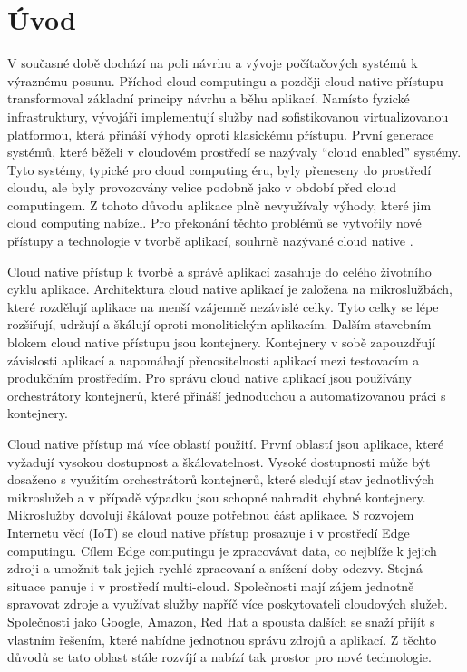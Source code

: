 \chapter{Úvod}
\setcounter{page}{1}
V současné době dochází na poli návrhu a vývoje počítačových systémů k výraznému posunu. Příchod cloud computingu a později cloud native přístupu transformoval \linebreak základní principy návrhu a běhu aplikací. Namísto fyzické infrastruktury, vývojáři \linebreak implementují služby nad sofistikovanou virtualizovanou platformou, která přináší \linebreak výhody oproti klasickému přístupu. První generace systémů, které běželi v cloudovém \linebreak prostředí se nazývaly “cloud enabled” systémy. Tyto systémy, typické pro cloud computing éru, byly přeneseny do prostředí cloudu, ale byly provozovány velice podobně jako v období před cloud computingem. Z tohoto důvodu aplikace plně nevyužívaly výhody, které jim cloud computing nabízel. Pro překonání těchto problémů se vytvořily nové přístupy a technologie v tvorbě aplikací, souhrně nazývané cloud native \cite{hotcloud}. 
\par
    Cloud native přístup k tvorbě a správě aplikací zasahuje do celého životního cyklu aplikace. Architektura cloud native aplikací je založena na mikroslužbách, které \linebreak rozdělují aplikace na menší vzájemně nezávislé celky. Tyto celky se lépe rozšiřují, udržují a škálují oproti monolitickým aplikacím. Dalším stavebním blokem cloud native přístupu jsou kontejnery. Kontejnery v sobě zapouzdřují závislosti aplikací a \linebreak napomáhají přenositelnosti aplikací mezi testovacím a produkčním prostředím. \linebreak Pro správu cloud native aplikací jsou používány orchestrátory kontejnerů, které přináší jednoduchou a automatizovanou práci s kontejnery. 
	\par
        Cloud native přístup má více oblastí použití. První oblastí jsou aplikace, které \linebreak vyžadují vysokou dostupnost a škálovatelnost. Vysoké dostupnosti může být dosaženo s využitím orchestrátorů kontejnerů, které sledují stav jednotlivých mikroslužeb \linebreak a v případě výpadku jsou schopné nahradit chybné kontejnery. Mikroslužby dovolují škálovat pouze potřebnou část aplikace. S rozvojem Internetu věcí (IoT) se cloud native přístup prosazuje i v prostředí Edge computingu. Cílem Edge computingu je zpracovávat data, co nejblíže k jejich zdroji a umožnit tak jejich rychlé zpracovaní a snížení doby odezvy. Stejná situace panuje i v prostředí multi-cloud. Společnosti mají zájem jednotně spravovat zdroje a využívat služby napříč více poskytovateli cloudových služeb. Společnosti jako Google, Amazon, Red Hat a spousta dalších se snaží přijít s vlastním řešením, které nabídne jednotnou správu zdrojů a aplikací. Z těchto důvodů se tato oblast stále rozvíjí a nabízí tak prostor pro nové technologie.
